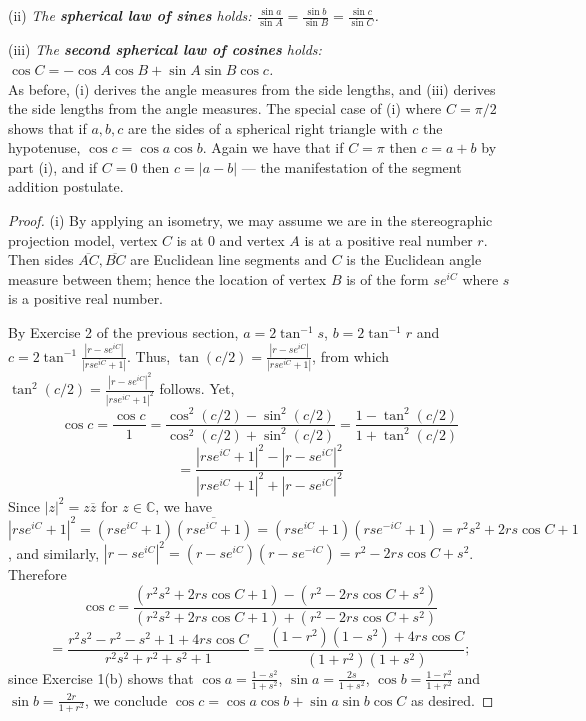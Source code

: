 \documentclass[leqno]{book}
\begin{document}
(ii) \emph{The \textbf{spherical law of sines} holds: $\frac{\sin a}{\sin A}=\frac{\sin b}{\sin B}=\frac{\sin c}{\sin C}$.}

(iii) \emph{The \textbf{second spherical law of cosines} holds: $\cos C=-\cos A\cos B+\sin A\sin B\cos c$.}\\

\noindent As before, (i) derives the angle measures from the side lengths, and (iii) derives the side lengths from the angle measures.  The special case of (i) where $C=\pi/2$ shows that if $a,b,c$ are the sides of a spherical right triangle with $c$ the hypotenuse, $\cos c=\cos a\cos b$.  Again we have that if $C=\pi$ then $c=a+b$ by part (i), and if $C=0$ then $c=|a-b|$ \---- the manifestation of the segment addition postulate.
\begin{proof}
(i) By applying an isometry, we may assume we are in the stereographic projection model, vertex $C$ is at $0$ and vertex $A$ is at a positive real number $r$.  Then sides $\overline{AC},\overline{BC}$ are Euclidean line segments and $C$ is the Euclidean angle measure between them; hence the location of vertex $B$ is of the form $se^{iC}$ where $s$ is a positive real number.

By Exercise 2 of the previous section, $a=2\tan^{-1}s$, $b=2\tan^{-1}r$ and $c=2\tan^{-1}\frac{|r-se^{iC}|}{|rse^{iC}+1|}$.  Thus, $\tan(c/2)=\frac{|r-se^{iC}|}{|rse^{iC}+1|}$, from which $\tan^2(c/2)=\frac{|r-se^{iC}|^2}{|rse^{iC}+1|^2}$ follows.  Yet,
$$\cos c=\frac{\cos c}1=\frac{\cos^2(c/2)-\sin^2(c/2)}{\cos^2(c/2)+\sin^2(c/2)}=\frac{1-\tan^2(c/2)}{1+\tan^2(c/2)}$$
$$=\frac{|rse^{iC}+1|^2-|r-se^{iC}|^2}{|rse^{iC}+1|^2+|r-se^{iC}|^2}$$
Since $|z|^2=z\overline z$ for $z\in\mathbb C$, we have $|rse^{iC}+1|^2=(rse^{iC}+1)\overline{(rse^{iC}+1)}=(rse^{iC}+1)(rse^{-iC}+1)=r^2s^2+2rs\cos C+1$, and similarly, $|r-se^{iC}|^2=(r-se^{iC})(r-se^{-iC})=r^2-2rs\cos C+s^2$.  Therefore
$$\cos c=\frac{(r^2s^2+2rs\cos C+1)-(r^2-2rs\cos C+s^2)}{(r^2s^2+2rs\cos C+1)+(r^2-2rs\cos C+s^2)}$$
$$=\frac{r^2s^2-r^2-s^2+1+4rs\cos C}{r^2s^2+r^2+s^2+1}=\frac{(1-r^2)(1-s^2)+4rs\cos C}{(1+r^2)(1+s^2)};$$
since Exercise 1(b) shows that $\cos a=\frac{1-s^2}{1+s^2}$, $\sin a=\frac{2s}{1+s^2}$, $\cos b=\frac{1-r^2}{1+r^2}$ and $\sin b=\frac{2r}{1+r^2}$, we conclude $\cos c=\cos a\cos b+\sin a\sin b\cos C$ as desired.


\end{proof}
\end{document}
